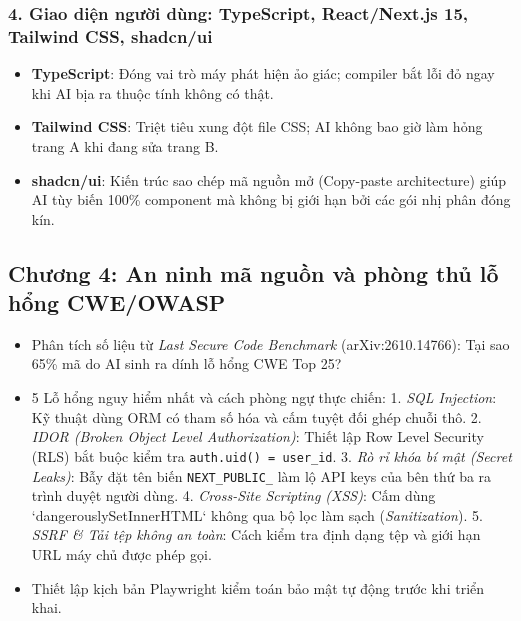 \documentclass[a4paper,11pt]{article}
\begin{document}
\subsubsection{4. Giao diện người dùng: TypeScript, React/Next.js 15, Tailwind CSS, shadcn/ui}
\begin{itemize}[leftmargin=1.5em]
    \item \textbf{TypeScript}: Đóng vai trò máy phát hiện ảo giác; compiler bắt lỗi đỏ ngay khi AI bịa ra thuộc tính không có thật.
    \item \textbf{Tailwind CSS}: Triệt tiêu xung đột file CSS; AI không bao giờ làm hỏng trang A khi đang sửa trang B.
    \item \textbf{shadcn/ui}: Kiến trúc sao chép mã nguồn mở (Copy-paste architecture) giúp AI tùy biến 100\% component mà không bị giới hạn bởi các gói nhị phân đóng kín.
\end{itemize}

\subsection{Chương 4: An ninh mã nguồn và phòng thủ lỗ hổng CWE/OWASP}
\begin{itemize}[leftmargin=1.5em]
    \item Phân tích số liệu từ \textit{Last Secure Code Benchmark} (arXiv:2610.14766): Tại sao 65\% mã do AI sinh ra dính lỗ hổng CWE Top 25?
    \item 5 Lỗ hổng nguy hiểm nhất và cách phòng ngự thực chiến:
        1. \textit{SQL Injection}: Kỹ thuật dùng ORM có tham số hóa và cấm tuyệt đối ghép chuỗi thô.
        2. \textit{IDOR (Broken Object Level Authorization)}: Thiết lập Row Level Security (RLS) bắt buộc kiểm tra \texttt{auth.uid() = user\_id}.
        3. \textit{Rò rỉ khóa bí mật (Secret Leaks)}: Bẫy đặt tên biến \texttt{NEXT\_PUBLIC\_} làm lộ API keys của bên thứ ba ra trình duyệt người dùng.
        4. \textit{Cross-Site Scripting (XSS)}: Cấm dùng `dangerouslySetInnerHTML` không qua bộ lọc làm sạch (\textit{Sanitization}).
        5. \textit{SSRF \& Tải tệp không an toàn}: Cách kiểm tra định dạng tệp và giới hạn URL máy chủ được phép gọi.
    \item Thiết lập kịch bản Playwright kiểm toán bảo mật tự động trước khi triển khai.
\end{itemize}
\end{document}

